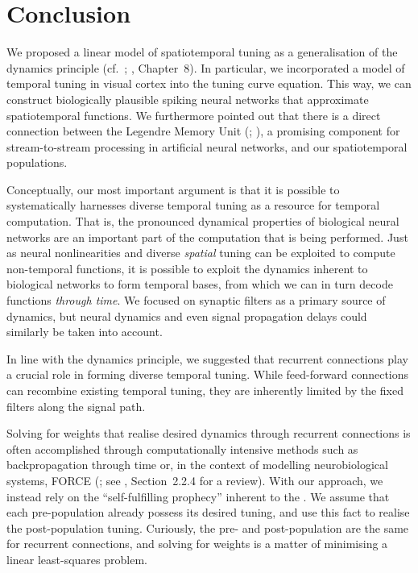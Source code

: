 
\section{Conclusion}
\label{sec:temporal_tuning_conclusion}

We proposed a linear model of spatiotemporal tuning as a generalisation of the \NEF dynamics principle (cf.~; \cite{eliasmith2003neural}, Chapter~8).
In particular, we incorporated a model of temporal tuning in visual cortex \citep[cf.][]{carandini1999linearity} into the \NEF tuning curve equation.
This way, we can construct biologically plausible spiking neural networks that approximate spatiotemporal functions.
We furthermore pointed out that there is a direct connection between the Legendre Memory Unit (\LMU; \cite{voelker2019lmu}), a promising component for stream-to-stream processing in artificial neural networks, and our spatiotemporal \NEF populations.

Conceptually, our most important argument is that it is possible to systematically harnesses diverse temporal tuning as a resource for temporal computation.
That is, the pronounced dynamical properties of biological neural networks are an important part of the computation that is being performed.
Just as neural nonlinearities and diverse \emph{spatial} tuning can be exploited to compute non-temporal functions, it is possible to exploit the dynamics inherent to biological networks to form temporal bases, from which we can in turn decode functions \emph{through time}.
We focused on synaptic filters as a primary source of dynamics, but neural dynamics and even signal propagation delays could similarly be taken into account.

In line with the \NEF dynamics principle, we suggested that recurrent connections play a crucial role in forming diverse temporal tuning.
While feed-forward connections can recombine existing temporal tuning, they are inherently limited by the fixed filters along the signal path.

Solving for weights that realise desired dynamics through recurrent connections is often accomplished through computationally intensive methods such as backpropagation through time \citep{werbos1990backpropagation} or, in the context of modelling neurobiological systems, FORCE (\cite{sussillo2009generating,nicola2017supervised}; see \cite{voelker2019}, Section~2.2.4 for a review).
With our approach, we instead rely on the \enquote{self-fulfilling prophecy} inherent to the \NEF.
We assume that each pre-population already possess its desired tuning, and use this fact to realise the post-population tuning.
Curiously, the pre- and post-population are the same for recurrent connections, and solving for weights is a matter of minimising a linear least-squares problem.

